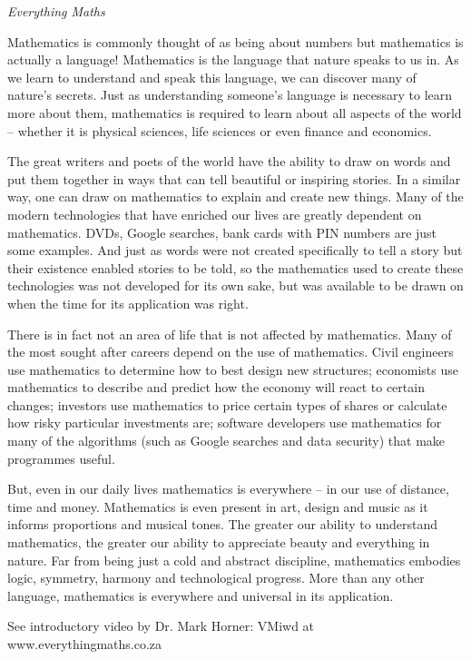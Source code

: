 \newpage
\thispagestyle{empty}

{\normalfont\sffamily\fontsize{22}\normalfont\itshape Everything Maths} \par

{
Mathematics is commonly thought of as being about numbers but mathematics is actually a language! Mathematics is the language that nature speaks to us in. As we learn to understand and speak this language, we can discover many of nature’s secrets. Just as understanding someone’s language is necessary to learn more about them, mathematics is required to learn about all aspects of the world -- whether it is physical sciences, life sciences or even finance and economics.\par


The great writers and poets of the world have the ability to draw on words and put them together in
ways that can tell beautiful or inspiring stories. In a similar way, one can draw on mathematics to
explain and create new things. Many of the modern technologies that have enriched our lives are
greatly dependent on mathematics. DVDs, Google searches, bank cards with PIN numbers are just
some examples. And just as words were not created specifically to tell a story but their existence enabled
stories to be told, so the mathematics used to create these technologies was not developed for its own sake,
but was available to be drawn on when the time for its application was right.\par


There is in fact not an area of life that is not affected by mathematics. Many of the most sought after
careers depend on the use of mathematics. Civil engineers use mathematics to determine how to best
design new structures; economists use mathematics to describe and predict how the economy will react
to certain changes; investors use mathematics to price certain types of shares or calculate how risky
particular investments are; software developers use mathematics for many of the algorithms (such as
Google searches and data security) that make programmes useful.\par



But, even in our daily lives mathematics is everywhere – in our use of distance, time and money.
Mathematics is even present in art, design and music as it informs proportions and musical tones. The
greater our ability to understand mathematics, the greater our ability to appreciate beauty and
everything in nature. Far from being just a cold and abstract discipline, mathematics
embodies logic, symmetry, harmony and technological progress. More than any other language,
mathematics is everywhere and universal in its application.\par


See introductory video by Dr. Mark Horner:  VMiwd at www.everythingmaths.co.za



}





